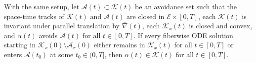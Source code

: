 \begin{theorem}
\label{ch04-thm-tensor-max-principle-avoidance}
With the same setup, let \(\mathcal A(t)\subset\mathcal K(t)\) be an avoidance set such that the space-time tracks of \(\mathcal K(t)\) and \(\mathcal A(t)\) are closed in \(\mathcal E\times[0,T]\), each \(\mathcal K(t)\) is invariant under parallel translation by \(\bar\nabla(t)\), each \(\mathcal K_x(t)\) is closed and convex, and \(\alpha(t)\) avoids \(\mathcal A(t)\) for all \(t\in[0,T]\). If every fiberwise ODE solution starting in \(\mathcal K_x(0)\setminus\mathcal A_x(0)\) either remains in \(\mathcal K_x(t)\) for all \(t\in[0,T]\) or enters \(\mathcal A(t_0)\) at some \(t_0\in(0,T]\), then \(\alpha(t)\in\mathcal K(t)\) for all \(t\in[0,T]\).
\end{theorem}
